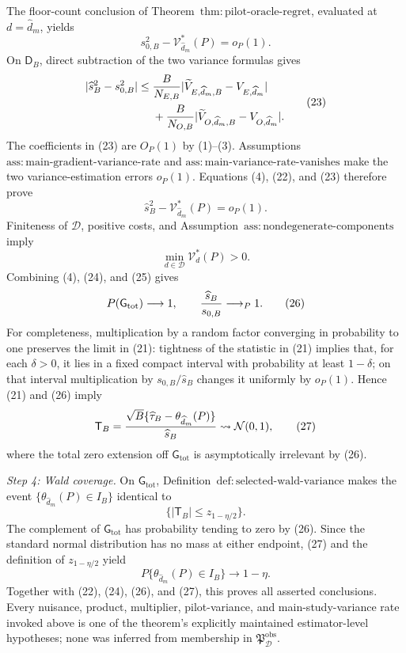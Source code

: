 The floor-count conclusion of Theorem~\(\mathrm{thm{:}pilot\text{-}oracle\text{-}regret}\), evaluated at \(d=\widehat d_m\), yields
\[
 s_{0,B}^2-\mathcal V_{\widehat d_m}^*(P)=o_P(1). \tag{22}
\]
On \(\mathsf D_B\), direct subtraction of the two variance formulas gives
\[
\begin{aligned}
 |\widehat s_B^2-s_{0,B}^2|
 \le{}&{B\over N_{E,B}}
 |\widetilde V_{E,\widehat d_m,B}-V_{E,\widehat d_m}|\\
 &+{B\over N_{O,B}}
 |\widetilde V_{O,\widehat d_m,B}-V_{O,\widehat d_m}|.
\end{aligned} \tag{23}
\]
The coefficients in (23) are \(O_P(1)\) by (1)--(3).  Assumptions~\(\mathrm{ass{:}main\text{-}gradient\text{-}variance\text{-}rate}\) and \(\mathrm{ass{:}main\text{-}variance\text{-}rate\text{-}vanishes}\) make the two variance-estimation errors \(o_P(1)\).  Equations (4), (22), and (23) therefore prove
\[
 \widehat s_B^2-\mathcal V_{\widehat d_m}^*(P)=o_P(1). \tag{24}
\]
Finiteness of \(\mathcal D\), positive costs, and Assumption~\(\mathrm{ass{:}nondegenerate\text{-}components}\) imply
\[
 \min_{d\in\mathcal D}\mathcal V_d^*(P)>0. \tag{25}
\]
Combining (4), (24), and (25) gives
\[
 P(\mathsf G_{\mathrm{tot}})\longrightarrow1,
 \qquad
 {\widehat s_B\over s_{0,B}}\longrightarrow_P1. \tag{26}
\]
For completeness, multiplication by a random factor converging in probability to one preserves the limit in (21): tightness of the statistic in (21) implies that, for each \(\delta>0\), it lies in a fixed compact interval with probability at least \(1-\delta\); on that interval multiplication by \(s_{0,B}/\widehat s_B\) changes it uniformly by \(o_P(1)\).  Hence (21) and (26) imply
\[
 \mathsf T_B
 ={\sqrt B\{\widehat\tau_B-\theta_{\widehat d_m}(P)\}\over\widehat s_B}
 \rightsquigarrow\mathcal N(0,1), \tag{27}
\]
where the total zero extension off \(\mathsf G_{\mathrm{tot}}\) is asymptotically irrelevant by (26).

\emph{Step 4: Wald coverage.}
On \(\mathsf G_{\mathrm{tot}}\), Definition~\(\mathrm{def{:}selected\text{-}wald\text{-}variance}\) makes the event
\(\{\theta_{\widehat d_m}(P)\in I_B\}\) identical to
\[
 \{|\mathsf T_B|\le z_{1-\eta/2}\}.
\]
The complement of \(\mathsf G_{\mathrm{tot}}\) has probability tending to zero by (26).  Since the standard normal distribution has no mass at either endpoint, (27) and the definition of \(z_{1-\eta/2}\) yield
\[
 P\{\theta_{\widehat d_m}(P)\in I_B\}
 \longrightarrow1-\eta.
\]
Together with (22), (24), (26), and (27), this proves all asserted conclusions.  Every nuisance, product, multiplier, pilot-variance, and main-study-variance rate invoked above is one of the theorem's explicitly maintained estimator-level hypotheses; none was inferred from membership in \(\mathfrak P_{\mathcal D}^{\mathrm{obs}}\).